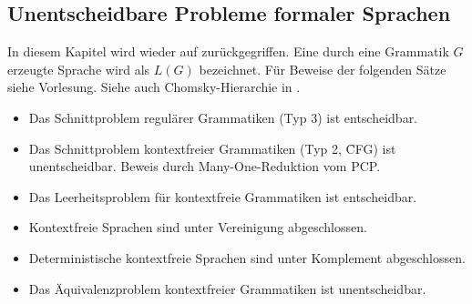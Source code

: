 \subsection{Unentscheidbare Probleme formaler Sprachen}
    In diesem Kapitel wird wieder auf  zurückgegriffen. Eine durch eine Grammatik $G$ erzeugte Sprache wird als $L(G)$ bezeichnet. Für Beweise der folgenden Sätze siehe Vorlesung. Siehe auch Chomsky-Hierarchie in . 
    \begin{itemize}
        \setlength\itemsep{0em}
        \item Das Schnittproblem regulärer Grammatiken (Typ 3) ist entscheidbar.
        \item Das Schnittproblem kontextfreier Grammatiken (Typ 2, \f{CFG}) ist unentscheidbar. Beweis durch Many-One-Reduktion vom PCP.
        \item Das Leerheitsproblem für kontextfreie Grammatiken ist entscheidbar.
        \item Kontextfreie Sprachen sind unter Vereinigung abgeschlossen.
        \item Deterministische kontextfreie Sprachen sind unter Komplement abgeschlossen.
        \item Das Äquivalenzproblem kontextfreier Grammatiken ist unentscheidbar.
    \end{itemize}

